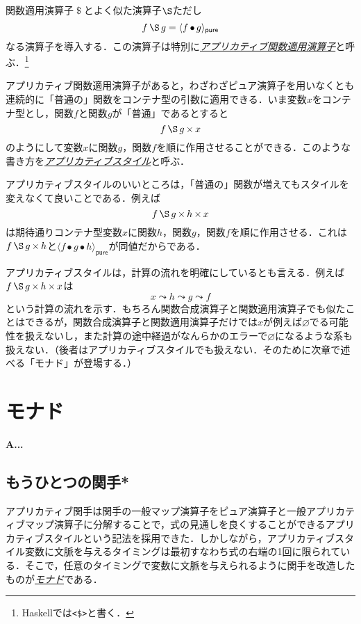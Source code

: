 \documentclass[a5paper,draft]{jsbook}
\newcommand{\programminglanguage}[1]{\textsf{#1}}
\newcommand{\haskell}{\programminglanguage{Haskell}}
\newenvironment{leader}{\begingroup\bf}{\endgroup}
\newcommand{\keyword}[1]{{\underline{\emph{#1}}}}
\newcommand{\code}[1]{\texttt{#1}}
\newcommand{\mathBinaryOperator}[1]{\operatorname{#1}}
\newcommand{\mathApply}{\mathBinaryOperator{\$}}
\newcommand{\mathCompose}{\mathBinaryOperator{\bullet}}
\DeclareMathOperator{\hsklApplicativeApply}{\S}
\DeclareMathOperator{\hsklApplicativeMap}{\times}
\newcommand{\hsklNothing}{\varnothing}
\newcommand{\hsklPure}[1]{\langle#1\rangle_\textsf{pure}}
\begin{document}
関数適用演算子$\mathApply$とよく似た演算子$\hsklApplicativeApply$ただし$$f\hsklApplicativeApply g=\hsklPure{f\mathCompose g}$$なる演算子を導入する．この演算子は特別に\keyword{アプリカティブ関数適用演算子}と呼ぶ．\footnote{\haskell では\code{<\$>}と書く．}

アプリカティブ関数適用演算子があると，わざわざピュア演算子を用いなくとも連続的に「普通の」関数をコンテナ型の引数に適用できる．いま変数$x$をコンテナ型とし，関数$f$と関数$g$が「普通」であるとすると$$f\hsklApplicativeApply g\hsklApplicativeMap x$$のようにして変数$x$に関数$g$，関数$f$を順に作用させることができる．このような書き方を\keyword{アプリカティブスタイル}と呼ぶ．

アプリカティブスタイルのいいところは，「普通の」関数が増えてもスタイルを変えなくて良いことである．例えば$$f\hsklApplicativeApply g\hsklApplicativeMap h\hsklApplicativeMap x$$は期待通りコンテナ型変数$x$に関数$h$，関数$g$，関数$f$を順に作用させる．これは$f\hsklApplicativeApply g\hsklApplicativeMap h$と$\hsklPure{f\mathCompose g\mathCompose h}$が同値だからである．

アプリカティブスタイルは，計算の流れを明確にしているとも言える．例えば$f\hsklApplicativeApply g\hsklApplicativeMap h\hsklApplicativeMap x$は$$x\leadsto h\leadsto g\leadsto f$$という計算の流れを示す．もちろん関数合成演算子と関数適用演算子でも似たことはできるが，関数合成演算子と関数適用演算子だけでは$x$が例えば$\hsklNothing$でる可能性を扱えないし，また計算の途中経過がなんらかのエラーで$\hsklNothing$になるような系も扱えない．（後者はアプリカティブスタイルでも扱えない．そのために次章で述べる「モナド」が登場する．）

\chapter{モナド}

\begin{leader}
A...
\end{leader}


\section{もうひとつの関手*}


アプリカティブ関手は関手の一般マップ演算子をピュア演算子と一般アプリカティブマップ演算子に分解することで，式の見通しを良くすることができるアプリカティブスタイルという記法を採用できた．しかしながら，アプリカティブスタイル変数に文脈を与えるタイミングは最初すなわち式の右端の1回に限られている．そこで，任意のタイミングで変数に文脈を与えられるように関手を改造したものが\keyword{モナド}である．
\end{document}
